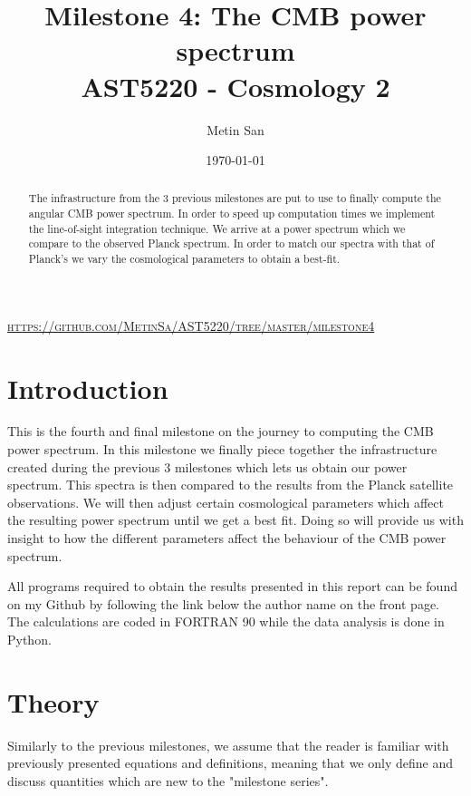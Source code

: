 \documentclass[a4paper, 10pt, reqno]{amsart}
\title[Milestone 4]{\Large{Milestone 4: The CMB power spectrum} \\
\normalsize{AST5220 - Cosmology 2}}
\author[San]{Metin San}
\date{\today}
\begin{document}
\maketitle
\begin{center}
   \vspace*{-0.6cm} \textsc{\url{https://github.com/MetinSa/AST5220/tree/master/milestone4}}
\end{center}

\begin{abstract}
The infrastructure from the 3 previous milestones are put to use to finally compute the angular CMB power spectrum. In order to speed up computation times we implement the line-of-sight integration technique. We arrive at a power spectrum which we compare to the observed Planck spectrum. In order to match our spectra with that of Planck's we vary the cosmological parameters to obtain a best-fit. 
\end{abstract}

\section{Introduction}
This is the fourth and final milestone on the journey to computing the CMB power spectrum. In this milestone we finally piece together the infrastructure created during the previous 3 milestones which lets us obtain our power spectrum. This spectra is then compared to the results from the Planck satellite observations. We will then adjust certain cosmological parameters which affect the resulting power spectrum until we get a best fit. Doing so will provide us with insight to how the different parameters affect the behaviour of the CMB power spectrum.

All programs required to obtain the results presented in this report can be found on my Github by following the link below the author name on the front page. The calculations are coded in FORTRAN 90 while the data analysis is done in Python. 

\section{Theory}

Similarly to the previous milestones, we assume that the reader is familiar with previously presented equations and definitions, meaning that we only define and discuss quantities which are new to the "milestone series".
\end{document}
